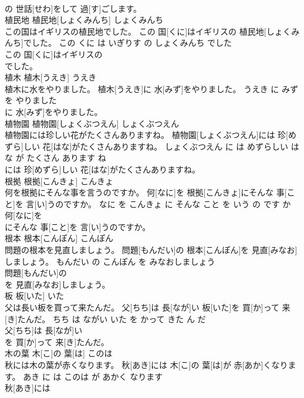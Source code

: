 \documentclass[8pt]{extreport}
\begin{document}
\begin{CJK}{UTF8}{min}
\\	の 世話[せわ]をして 過[す]ごします。			
\\	植民地	植民地[しょくみんち]	しょくみんち	
\\	この国はイギリスの植民地でした。	この 国[くに]はイギリスの 植民地[しょくみんち]でした。	この くに は いぎりす の しょくみんち でした	
\\	この 国[くに]はイギリスの
\\	でした。			
\\	植木	植木[うえき]	うえき	
\\	植木に水をやりました。	植木[うえき]に 水[みず]をやりました。	うえき に みず を やりました	
\\	に 水[みず]をやりました。			
\\	植物園	植物園[しょくぶつえん]	しょくぶつえん	
\\	植物園には珍しい花がたくさんありますね。	植物園[しょくぶつえん]には 珍[めずら]しい 花[はな]がたくさんありますね。	しょくぶつえん に は めずらしい はな が たくさん あります ね	
\\	には 珍[めずら]しい 花[はな]がたくさんありますね。			
\\	根拠	根拠[こんきょ]	こんきょ	
\\	何を根拠にそんな事を言うのですか。	何[なに]を 根拠[こんきょ]にそんな 事[こと]を 言[い]うのですか。	なに を こんきょ に そんな こと を いう の です か	
\\	何[なに]を
\\	にそんな 事[こと]を 言[い]うのですか。			
\\	根本	根本[こんぽん]	こんぽん	
\\	問題の根本を見直しましょう。	問題[もんだい]の 根本[こんぽん]を 見直[みなお]しましょう。	もんだい の こんぽん を みなおしましょう	
\\	問題[もんだい]の
\\	を 見直[みなお]しましょう。			
\\	板	板[いた]	いた	
\\	父は長い板を買って来たんだ。	父[ちち]は 長[なが]い 板[いた]を 買[か]って 来[き]たんだ。	ちち は ながい いた を かって きた ん だ	
\\	父[ちち]は 長[なが]い
\\	を 買[か]って 来[き]たんだ。			
\\	木の葉	木[こ]の 葉[は]	このは	
\\	秋には木の葉が赤くなります。	秋[あき]には 木[こ]の 葉[は]が 赤[あか]くなります。	あき に は このは が あかく なります	
\\	秋[あき]には

\end{CJK}
\end{document}
